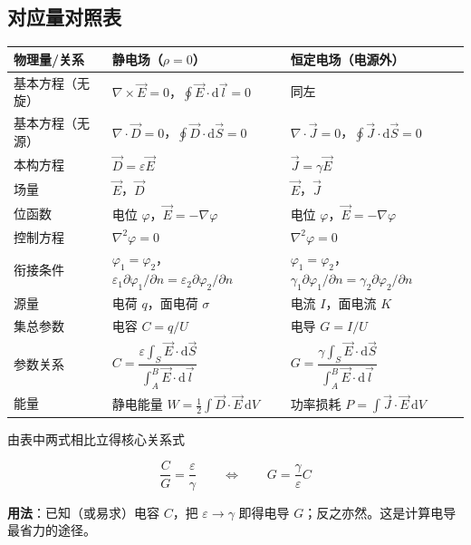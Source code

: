 \subsection{对应量对照表}
\begin{center}
\small
\begin{tabularx}{\linewidth}{@{}l X X@{}}
\toprule
\textbf{物理量/关系} & \textbf{静电场（$\rho=0$）} & \textbf{恒定电场（电源外）} \\
\midrule
基本方程（无旋） & $\nabla\times\vec{E}=0$，$\oint\vec{E}\cdot\mathrm{d}\vec{l}=0$ & 同左 \\
基本方程（无源） & $\nabla\cdot\vec{D}=0$，$\oint\vec{D}\cdot\mathrm{d}\vec{S}=0$ & $\nabla\cdot\vec{J}=0$，$\oint\vec{J}\cdot\mathrm{d}\vec{S}=0$ \\
本构方程 & $\vec{D}=\varepsilon\vec{E}$ & $\vec{J}=\gamma\vec{E}$ \\
场量 & $\vec{E}$，$\vec{D}$ & $\vec{E}$，$\vec{J}$ \\
位函数 & 电位 $\varphi$，$\vec{E}=-\nabla\varphi$ & 电位 $\varphi$，$\vec{E}=-\nabla\varphi$ \\
控制方程 & $\nabla^2\varphi=0$ & $\nabla^2\varphi=0$ \\
衔接条件 & $\varphi_1=\varphi_2$，$\varepsilon_1\partial\varphi_1/\partial n=\varepsilon_2\partial\varphi_2/\partial n$ & $\varphi_1=\varphi_2$，$\gamma_1\partial\varphi_1/\partial n=\gamma_2\partial\varphi_2/\partial n$ \\
源量 & 电荷 $q$，面电荷 $\sigma$ & 电流 $I$，面电流 $K$ \\
集总参数 & 电容 $C=q/U$ & 电导 $G=I/U$ \\
参数关系 & $C=\dfrac{\varepsilon\int_S\vec{E}\cdot\mathrm{d}\vec{S}}{\int_A^B\vec{E}\cdot\mathrm{d}\vec{l}}$ & $G=\dfrac{\gamma\int_S\vec{E}\cdot\mathrm{d}\vec{S}}{\int_A^B\vec{E}\cdot\mathrm{d}\vec{l}}$ \\
能量 & 静电能量 $W=\frac12\int\vec{D}\cdot\vec{E}\,\mathrm{d}V$ & 功率损耗 $P=\int\vec{J}\cdot\vec{E}\,\mathrm{d}V$ \\
\bottomrule
\end{tabularx}
\end{center}
由表中两式相比立得核心关系式
\begin{formulaBox}
\[
\frac{C}{G}=\frac{\varepsilon}{\gamma}
\qquad\Longleftrightarrow\qquad
G=\frac{\gamma}{\varepsilon}C
\]
\end{formulaBox}
\textbf{用法}：已知（或易求）电容 $C$，把 $\varepsilon\to\gamma$ 即得电导 $G$；反之亦然。这是计算电导最省力的途径。

